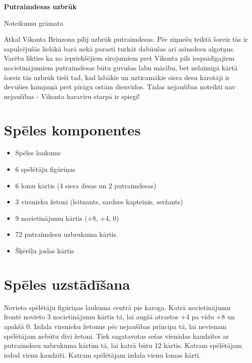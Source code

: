 \documentclass[11pt,a4paper,titlepage]{article}
\begin{document}
\begin{center}
  \begin{Huge}
  \textbf{Putraimdesas uzbrūk \\} 
\end{Huge}   {\Large Noteikumu grāmata}
\end{center}  
Atkal Vikonta Brinzona pilij uzbrūk putraimdesas. Pēc ziņnešu teiktā šoreiz tās ir sapulcējušās lielākā barā nekā 
parasti turkāt dabūušas arī asinsdesu algotņus. Varētu likties ka no iepriekšējiem sirojumiem pret Vikonta pils 
iespaidīgajiem nocietinājumiem putraimdesas būtu guvušas labu mācību, bet nelaimīgā kārtā šoreiz tās uzbrūk tieši 
tad, kad labākie un uzticamākie siera desu karotāji ir devušies kampaņā pret pīrāgu ostām dienvidos. Tādas nejaušības 
noteikti nav nejaušības - Vikonta karavīru starpā ir spiegi!

\section*{Spēles komponentes}
\begin{itemize}
\item Spēles laukums
\item 6 spēlētāju figūriņas
\item 6 lomu kārtis (4 siera desas un 2 putraimdesas)
\item 3 virsnieku žetoni (leitnants, sardzes kapteinis, seržants)
\item 9 nocietinājumu kārtis (+8, +4, 0)
\item 72 putraimdesu uzbrukuma kārtis.
\item Šķēršļu joslas kārtis
\end{itemize}

\section*{Spēles uzstādīšana}
Novieto spēlētāju figūriņas laukuma centrā pie karoga. Katrā nocietinājumu frontē novieto 3 nocietinājumu kārtis tā, lai
augšā atrastos +4 pa vidu +8 un apakšā 0. Izdala virsnieku žetonus pēc nejaušības principa tā, lai nevienam
spēlētājam nebūtu divi žetoni. Tiek sagatavotas sešas vienādas kaudzītes ar putraimdesu uzbrukuma kārtīm tā,
lai katrā būtu 12 kārtis. Katram spēlētājam iedod vienu kaudzīti. Katram spēlētājam izdala vienu lomas kārti.
\end{document}
